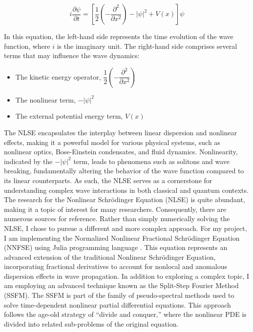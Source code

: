 \documentclass[8pt, a4paper, twocolumn]{article}
\begin{document}
\begin{equation}
	i\frac{\partial\psi}{\partial t} = \left[\frac{1}{2}\left(- \frac{\partial^2}
	{\partial x^2}\right) -|\psi|^2 + V(x)\right] \psi
\end{equation}

In this equation, the left-hand side represents the time evolution of the wave function, where $i$ 
is the imaginary unit. The right-hand side comprises several terms that may influence the wave dynamics: 
\begin{itemize}
	\item The kinetic energy operator, $\dfrac{1}{2}\left(- \dfrac{\partial^2}{\partial x^2}\right)$
	\item The nonlinear term, $-|\psi|^2 $
	\item The external potential energy term, $V(x)$
\end{itemize}

The NLSE encapsulates the interplay between linear dispersion and nonlinear effects, making it a powerful model 
for various physical systems, such as nonlinear optics, Bose-Einstein condensates, and fluid dynamics. 
Nonlinearity, indicated by the $-|\psi|^2$ term, leads to phenomena such as solitons and wave breaking, fundamentally 
altering the behavior of the wave function compared to its linear counterparts. As such, the NLSE serves as a 
cornerstone for understanding complex wave interactions in both classical and quantum contexts.\\

The research for the Nonlinear Schrödinger Equation (NLSE) is quite abundant, making it a topic of interest for 
many researchers. Consequently, there are numerous sources for reference. Rather than simply numerically 
solving the NLSE, I chose to pursue a different and more complex approach. For my project, I am implementing 
the Normalized Nonlinear Fractional Schrödinger Equation (NNFSE) using Julia programming language \cite{bezanson2017julia}. 
This equation represents an advanced extension 
of the traditional Nonlinear Schrödinger Equation, incorporating fractional derivatives to account for 
nonlocal and anomalous dispersion effects in wave propagation. In addition to exploring a complex
topic, I am employing an advanced technique known as the Split-Step Fourier Method (SSFM). The SSFM is part of 
the family of pseudo-spectral methods used to solve time-dependent nonlinear partial differential equations. 
This approach follows the age-old strategy of ``divide and conquer,'' where the nonlinear PDE is divided into 
related sub-problems of the original equation.
\end{document}

